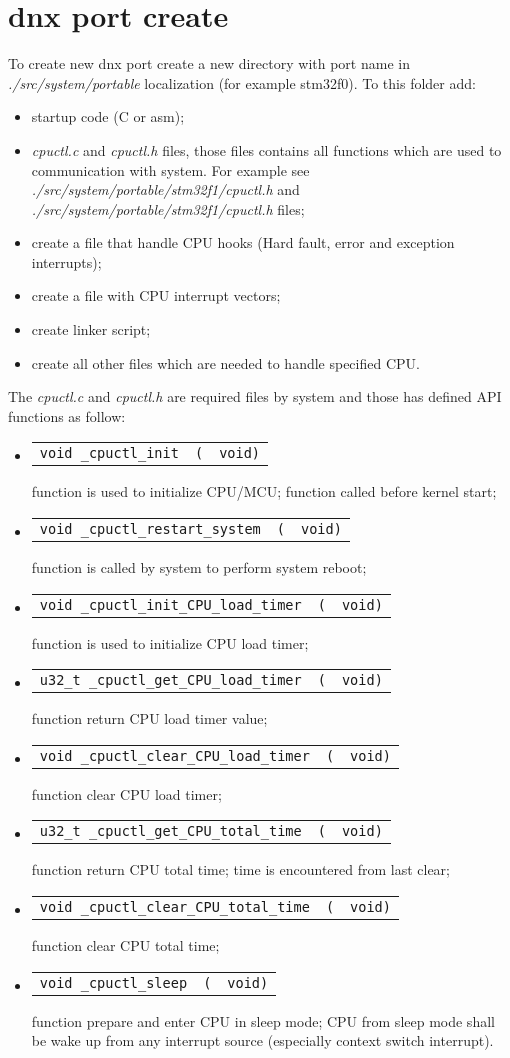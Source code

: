 \documentclass[a4paper,11pt]{report}
\makeatletter
\renewcommand{\path}[1]{\textit{#1}}
\newcommand{\code}[1]{\texttt{#1}}
\newcommand{\prototype}[2]{
   \begin{tabularx}{\textwidth}{@{}l@{}l@{}X}
      \code{#1} & \code{(} & \code{#2)}
   \end{tabularx}
}
\makeatother
\begin{document}
\section{dnx port create}
To create new dnx port create a new directory with port name in \path{./src/system/portable} localization
(for example stm32f0). To this folder add:
\begin{itemize}
   \item startup code (C or asm);
   \item \path{cpuctl.c} and \path{cpuctl.h} files, those files contains all functions which are used
         to communication with system. For example see \path{./src/system/portable/stm32f1/cpuctl.h}
         and \path{./src/system/portable/stm32f1/cpuctl.h} files;
   \item create a file that handle CPU hooks (Hard fault, error and exception interrupts);
   \item create a file with CPU interrupt vectors;
   \item create linker script;
   \item create all other files which are needed to handle specified CPU.
\end{itemize}

The \path{cpuctl.c} and \path{cpuctl.h} are required files by system and those has defined API functions
as follow:
\begin{itemize}
   \item \prototype{void \_cpuctl\_init}{void}
         function is used to initialize CPU/MCU; function called before kernel start;

   \item \prototype{void \_cpuctl\_restart\_system}{void}
         function is called by system to perform system reboot;

   \item \prototype{void \_cpuctl\_init\_CPU\_load\_timer}{void}
         function is used to initialize CPU load timer;

   \item \prototype{u32\_t \_cpuctl\_get\_CPU\_load\_timer}{void}
         function return CPU load timer value;

   \item \prototype{void \_cpuctl\_clear\_CPU\_load\_timer}{void}
         function clear CPU load timer;

   \item \prototype{u32\_t \_cpuctl\_get\_CPU\_total\_time}{void}
         function return CPU total time; time is encountered from last clear;

   \item \prototype{void \_cpuctl\_clear\_CPU\_total\_time}{void}
         function clear CPU total time;

   \item \prototype{void \_cpuctl\_sleep}{void}
         function prepare and enter CPU in sleep mode; CPU from sleep mode shall be wake up from any
         interrupt source (especially context switch interrupt).
\end{itemize}
\end{document}

